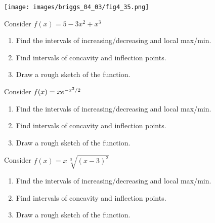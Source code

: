 \documentclass[answers]{exam}
\begin{document}
\begin{center}
  \texttt{[image: images/briggs\_04\_03/fig4\_35.png]}
\end{center}
\pagebreak

\noindent
{}
\begin{ex*}
  Consider $f(x)=5-3x^2+x^3$
\end{ex*}
\begin{enumerate}[itemsep=\stretch{1}, label=\alph*)]
  \item Find the intervals of increasing/decreasing and local max/min.
  \item Find intervals of concavity and inflection points.
  \item Draw a rough sketch of the function.
\end{enumerate}
\pagebreak

\begin{ex*}
  Consider $f(x)=xe\inv[x^2/2]$
\end{ex*}
\begin{enumerate}[itemsep=\stretch{1}, label=\alph*)]
  \item Find the intervals of increasing/decreasing and local max/min.
  \item Find intervals of concavity and inflection points.
  \item Draw a rough sketch of the function.
\end{enumerate}
\pagebreak

\begin{ex*}
  Consider $f(x)=x\,\sqrt[3]{(x-3)^2}$
\end{ex*}
\begin{enumerate}[itemsep=\stretch{1}, label=\alph*)]
  \item Find the intervals of increasing/decreasing and local max/min.
  \item Find intervals of concavity and inflection points.
  \item Draw a rough sketch of the function.
\end{enumerate}
\pagebreak
\end{document}
